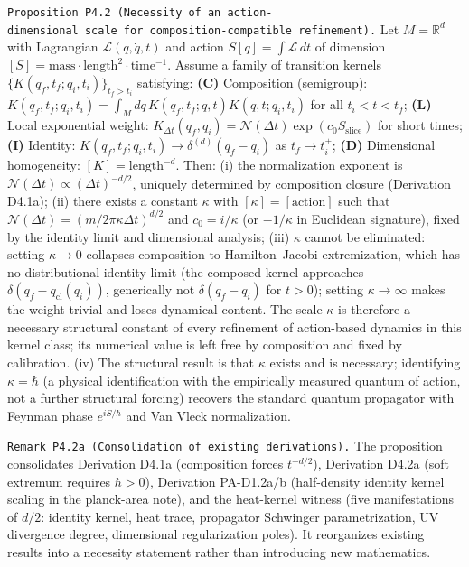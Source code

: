 \documentclass[
]{article}
\begin{document}
\texttt{Proposition\ P4.2\ (Necessity\ of\ an\ action-dimensional\ scale\ for\ composition-compatible\ refinement).}
Let \(M=\mathbb R^d\) with Lagrangian \(\mathcal L(q,\dot q,t)\) and
action \(S[q]=\int\mathcal L\,dt\) of dimension
\([S]=\mathrm{mass}\cdot\mathrm{length}^2\cdot\mathrm{time}^{-1}\).
Assume a family of transition kernels
\(\{K(q_f,t_f;q_i,t_i)\}_{t_f>t_i}\) satisfying: \textbf{(C)}
Composition (semigroup):
\(K(q_f,t_f;q_i,t_i)=\int_M dq\,K(q_f,t_f;q,t)K(q,t;q_i,t_i)\) for all
\(t_i<t<t_f\); \textbf{(L)} Local exponential weight:
\(K_{\Delta t}(q_f,q_i)=\mathcal N(\Delta t)\exp(c_0 S_{\mathrm{slice}})\)
for short times; \textbf{(I)} Identity:
\(K(q_f,t_f;q_i,t_i)\to\delta^{(d)}(q_f-q_i)\) as \(t_f\to t_i^+\);
\textbf{(D)} Dimensional homogeneity: \([K]=\mathrm{length}^{-d}\).
Then: (i) the normalization exponent is
\(\mathcal N(\Delta t)\propto(\Delta t)^{-d/2}\), uniquely determined by
composition closure (Derivation D4.1a); (ii) there exists a constant
\(\kappa\) with \([\kappa]=[\mathrm{action}]\) such that
\(\mathcal N(\Delta t)=(m/2\pi\kappa\Delta t)^{d/2}\) and
\(c_0=i/\kappa\) (or \(-1/\kappa\) in Euclidean signature), fixed by the
identity limit and dimensional analysis; (iii) \(\kappa\) cannot be
eliminated: setting \(\kappa\to0\) collapses composition to
Hamilton--Jacobi extremization, which has no distributional identity
limit (the composed kernel approaches
\(\delta(q_f-q_{\mathrm{cl}}(q_i))\), generically not
\(\delta(q_f-q_i)\) for \(t>0\)); setting \(\kappa\to\infty\) makes the
weight trivial and loses dynamical content. The scale \(\kappa\) is
therefore a necessary structural constant of every refinement of
action-based dynamics in this kernel class; its numerical value is left
free by composition and fixed by calibration. (iv) The structural result
is that \(\kappa\) exists and is necessary; identifying \(\kappa=\hbar\)
(a physical identification with the empirically measured quantum of
action, not a further structural forcing) recovers the standard quantum
propagator with Feynman phase \(e^{iS/\hbar}\) and Van Vleck
normalization.

\texttt{Remark\ P4.2a\ (Consolidation\ of\ existing\ derivations).} The
proposition consolidates Derivation D4.1a (composition forces
\(t^{-d/2}\)), Derivation D4.2a (soft extremum requires \(\hbar>0\)),
Derivation PA-D1.2a/b (half-density identity kernel scaling in the
planck-area note), and the heat-kernel witness (five manifestations of
\(d/2\): identity kernel, heat trace, propagator Schwinger
parametrization, UV divergence degree, dimensional regularization
poles). It reorganizes existing results into a necessity statement
rather than introducing new mathematics.
\end{document}
